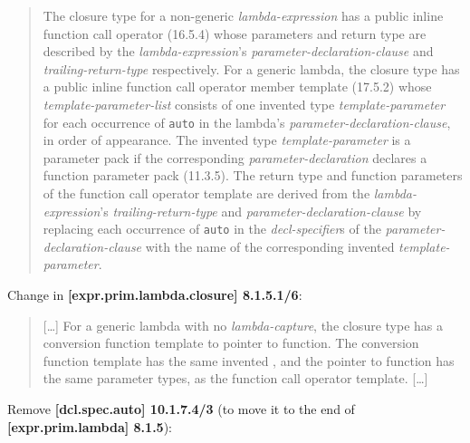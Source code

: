 \documentclass{wg21}
\newcommand{\cc}[1]{\texttt{#1}}
\begin{document}
\begin{quote}
  The closure type for a non-generic \textit{lambda-expression} has a public
  inline function call operator (16.5.4) whose parameters and return type are
  described by the \textit{lambda-expression}'s \textit{parameter-declaration-clause}
  and \textit{trailing-return-type} respectively. For a generic lambda, the
  closure type has a public inline function call operator member template
  (17.5.2) whose \textit{template-parameter-list} consists of 
  one invented type \textit{template-parameter} for each occurrence of \cc{auto}
  in the lambda's \textit{parameter-declaration-clause}, in order of appearance.
  The invented type \textit{template-parameter} is a parameter pack if the
  corresponding \textit{parameter-declaration} declares a function parameter
  pack (11.3.5). The return type and function parameters of the function call
  operator template are derived from the \textit{lambda-expression}'s
  \textit{trailing-return-type} and \textit{parameter-declaration-clause} by
  replacing each occurrence of \cc{auto} in the \textit{decl-specifier}s of
  the \textit{parameter-declaration-clause} with the name of the corresponding
  invented \textit{template-parameter}.
\end{quote}

Change in \textbf{[expr.prim.lambda.closure] 8.1.5.1/6}:

\begin{quote}
  [\dots] For a generic lambda with no \textit{lambda-capture}, the closure type
  has a conversion function template to pointer to function. The conversion function
  template has the same invented , and the pointer to function has the same parameter types, as
  the function call operator template. [\dots]
\end{quote}

Remove \textbf{[dcl.spec.auto] 10.1.7.4/3} (to move it to the end of
\textbf{[expr.prim.lambda] 8.1.5}):
\begin{quote}
\end{quote}
\end{document}

